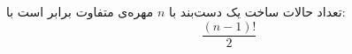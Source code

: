 \begin{THEOREM}
    \p
    تعداد حالات ساخت یک دست‌بند با
    $n$
    مهره‌ی متفاوت برابر است با:
    $$\frac{(n-1)!}{2}$$
\end{THEOREM}